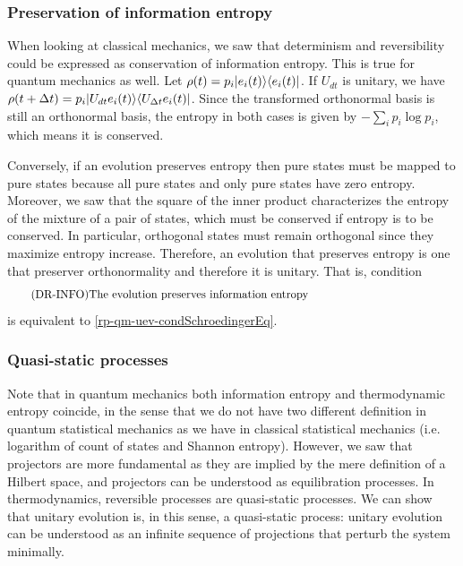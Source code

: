 \subsubsection{Preservation of information entropy}
When looking at classical mechanics, we saw that determinism and reversibility could be expressed as conservation of information entropy. This is true for quantum mechanics as well. Let $\rho(t)= p_i |e_i(t) \rangle \langle e_i(t)|$. If $U_{dt}$ is unitary, we have $\rho(t+ \Delta t) = p_i |U_{dt}e_i(t) \rangle \langle U_{\Delta t} e_i(t)|$. Since the transformed orthonormal basis is still an orthonormal basis, the entropy in both cases is given by $- \sum_i p_i \log p_i$, which means it is conserved.

Conversely, if an evolution preserves entropy then pure states must be mapped to pure states because all pure states and only pure states have zero entropy. Moreover, we saw that the square of the inner product characterizes the entropy of the mixture of a pair of states, which must be conserved if entropy is to be conserved. In particular, orthogonal states must remain orthogonal since they maximize entropy increase. Therefore, an evolution that preserves entropy is one that preserver orthonormality and therefore it is unitary. That is, condition
\begin{equation}\label{rp-qm-uev-condInfoEntropy}
	\tag{DR-INFO}
	\eqtext{The evolution preserves information entropy} 
\end{equation}
is equivalent to \ref{rp-qm-uev-condSchroedingerEq}.

\subsubsection{Quasi-static processes}
Note that in quantum mechanics both information entropy and thermodynamic entropy coincide, in the sense that we do not have two different definition in quantum statistical mechanics as we have in classical statistical mechanics (i.e. logarithm of count of states and Shannon entropy). However, we saw that projectors are more fundamental as they are implied by the mere definition of a Hilbert space, and projectors can be understood as equilibration processes. In thermodynamics, reversible processes are quasi-static processes. We can show that unitary evolution is, in this sense, a quasi-static process: unitary evolution can be understood as an infinite sequence of projections that perturb the system minimally.

